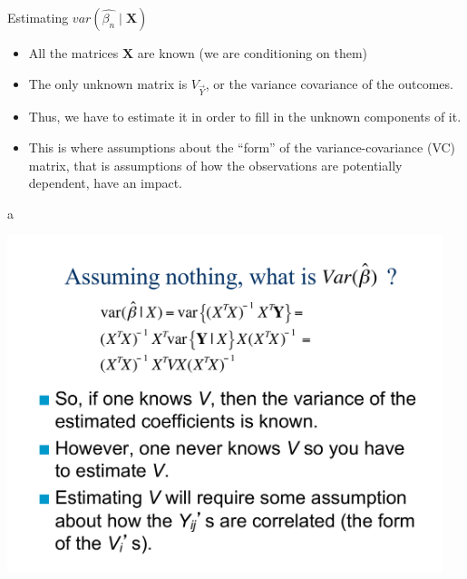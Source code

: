 \documentclass[ignorenonframetext,]{beamer}
\providecommand{\tightlist}{%
  \setlength{\itemsep}{0pt}\setlength{\parskip}{0pt}}
\begin{document}
\begin{frame}{Estimating \(var(\hat{\beta_n}\mid \boldsymbol{X})\)}

\begin{itemize}
\tightlist
\item
  All the matrices \(\boldsymbol{X}\) are known (we are conditioning on
  them)
\item
  The only unknown matrix is \(V_{\vec{Y}}\), or the variance covariance
  of the outcomes.
\item
  Thus, we have to estimate it in order to fill in the unknown
  components of it.
\item
  This is where assumptions about the ``form'' of the
  variance-covariance (VC) matrix, that is assumptions of how the
  observations are potentially dependent, have an impact.
\end{itemize}

\end{frame}

\begin{frame}{a}

\includegraphics[page=2,width=5in]{Chapter5AddSlides1.pdf}

\end{frame}
\end{document}
